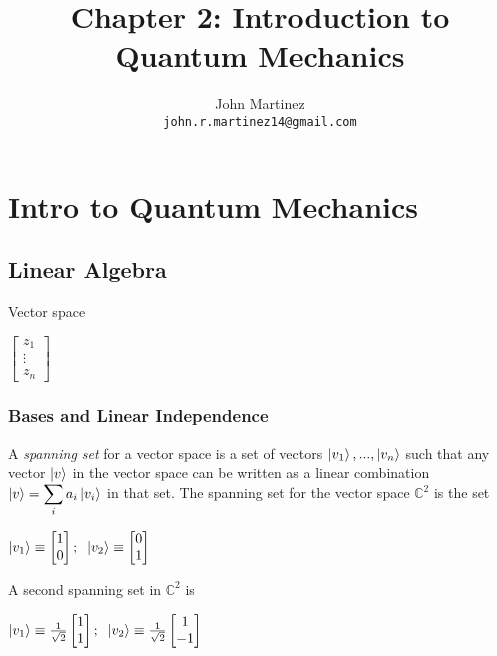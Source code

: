 \documentclass{article}
\title{Chapter 2: Introduction to Quantum Mechanics}
\author{
  John Martinez \\
  \texttt{john.r.martinez14@gmail.com} \\
}
\begin{document}
\maketitle

\section{Intro to Quantum Mechanics}
\subsection{Linear Algebra}
Vector space
\begin{center}
  $\begin{bmatrix}
    z_{1} \\
    \vdots \\
    z_{n}
  \end{bmatrix}$
\end{center}

\subsubsection{Bases and Linear Independence}
A \emph{spanning set} for a vector space is a set of vectors
$\ket{v_{1}},...,\ket{v_{n}}$ such that any vector $\ket{v}$ in the vector
space can be written as a linear combination
$\ket{v} = \displaystyle\sum_{i}a_{i}\ket{v_{i}}$ in that set. The spanning
set for the vector space $\mathbb{C}^{2}$ is the set
  \begin{center}
    $\ket{v_{1}} \equiv \begin{bmatrix} 1 \\ 0 \end{bmatrix};\mspace{10mu}
    \ket{v_{2}} \equiv \begin{bmatrix} 0 \\ 1 \end{bmatrix}$
  \end{center}

A second spanning set in $\mathbb{C}^{2}$ is
  \begin{center}
    $
    \ket{v_{1}} \equiv \frac{1}{\sqrt{2}}
      \begin{bmatrix} 1 \\ 1
      \end{bmatrix};\mspace{10mu}
    \ket{v_{2}} \equiv \frac{1}{\sqrt{2}}
      \begin{bmatrix} 1 \\ -1
      \end{bmatrix}$
  \end{center}
\end{document}
